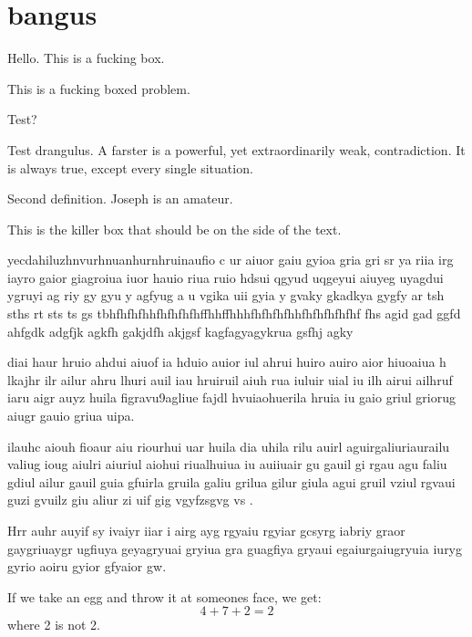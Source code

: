

\section{bangus}


Hello. This is a fucking box.	




\begin{prblm}[Dang]
This is a fucking boxed problem.	
\end{prblm}
	



\begin{prblm}
	Test?
\end{prblm}


\begin{defn}[Farster]
Test drangulus. A farster is a powerful, yet extraordinarily weak, contradiction. It is always true, except every single situation.
\end{defn}


\begin{defn}
Second definition. Joseph is an amateur.
\end{defn}

\begin{WrapBoxR}
This is the killer box that should be on the side of the text.	
\end{WrapBoxR}


yecdahiluzhnvurhnuanhurnhruinaufio c ur aiuor gaiu gyioa gria gri sr ya riia irg iayro gaior giagroiua iuor hauio riua ruio hdsui qgyud uqgeyui aiuyeg uyagdui ygruyi ag riy gy gyu y agfyug a u vgika uii gyia y gvaky gkadkya gygfy ar tsh sths rt sts ts gs tbhfhfhfhhfhfhfhfhffhhffhhhfhfhfhfhhfhfhfhfhfhf fhs agid gad ggfd ahfgdk adgfjk agkfh gakjdfh akjgsf kagfagyagykrua gsfhj agky

\begin{WrapBoxL}
diai haur hruio ahdui aiuof ia hduio auior iul ahrui huiro auiro aior hiuoaiua h lkajhr ilr ailur ahru lhuri auil iau hruiruil aiuh rua iuluir uial iu ilh airui ailhruf iaru aigr auyz huila figravu9agliue fajdl hvuiaohuerila hruia iu gaio griul griorug aiugr gauio griua uipa.	
\end{WrapBoxL}



ilauhc aiouh fioaur aiu riourhui uar huila dia uhila rilu auirl aguirgaliuriaurailu valiug ioug aiulri aiuriul aiohui riualhuiua iu auiiuair gu gauil gi rgau agu faliu gdiul ailur gauil guia gfuirla gruila galiu grilua gilur giula agui gruil vziul rgvaui guzi gvuilz giu aliur zi uif gig vgyfzsgvg vs .

Hrr auhr auyif sy ivaiyr iiar i airg ayg rgyaiu rgyiar gcsyrg iabriy graor gaygriuaygr ugfiuya geyagryuai gryiua gra guagfiya gryaui egaiurgaiugryuia iuryg gyrio aoiru gyior gfyaior gw.


\begin{example}
	If we take an egg and throw it at someones face, we get:
	$$
	4+7+2=2
	$$
	where 2 is not 2.
\end{example}

